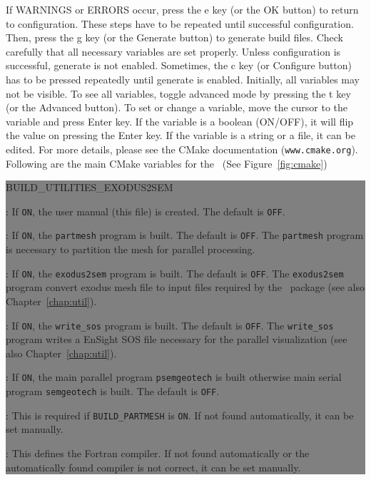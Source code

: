 If WARNINGS or ERRORS occur, press the e key (or the OK button) to return to configuration. These steps have to be repeated until successful configuration. Then, press the g key (or the Generate button) to generate build files. Check carefully that all necessary variables are set properly. Unless configuration is successful, generate is not enabled. Sometimes, the c key (or Configure button) has to be pressed repeatedly until generate is enabled. Initially, all variables may not be visible. To see all variables, toggle advanced mode by pressing the t key (or the Advanced button).
To set or change a variable, move the cursor to the variable and press Enter key. If the variable is a boolean (ON/OFF), it will flip the value on pressing the Enter key. If the variable is a string or a file, it can be edited. For more details, please see the CMake documentation (\texttt{www.cmake.org}).
\\

Following are the main CMake variables for the \pack\ (See Figure~\ref{fig:cmake})

\colorbox{gray}{
\parbox{15.5cm}{
\begin{adescription}{BUILD\_UTILITIES\_EXODUS2SEM}
\item[BUILD\_DOCUMENTATION]           : If \texttt{ON}, the user manual (this file) is created. The default is \texttt{OFF}.
\item[BUILD\_PARTMESH]                : If \texttt{ON}, the \texttt{partmesh} program is built. The default is \texttt{OFF}. The \texttt{partmesh} program is necessary to partition the mesh for parallel processing.
\item[BUILD\_UTILITIES\_EXODUS2SEM]   : If \texttt{ON}, the \texttt{exodus2sem} program is built. The default is \texttt{OFF}. The \texttt{exodus2sem} program convert exodus mesh file to input files required by the \pack\ package (see also Chapter~\ref{chap:util}).
\item[BUILD\_UTILITIES\_WRITE\_SOS]   : If \texttt{ON}, the \texttt{write\_sos} program is built. The default is \texttt{OFF}. The \texttt{write\_sos} program writes a EnSight SOS file necessary for the parallel visualization (see also Chapter~\ref{chap:util}).
\item[ENABLE\_MPI]                    : If \texttt{ON}, the main parallel program \texttt{psemgeotech} is built otherwise main serial program \texttt{semgeotech} is built. The default is \texttt{OFF}.
\item[SCOTCH\_LIBRARY\_PATH]          : This is required if \texttt{BUILD\_PARTMESH} is \texttt{ON}. If not found automatically, it can be set manually.
\item[CMAKE\_Fortran\_COMPILER]       : This defines the Fortran compiler. If not found automatically or the automatically found compiler is not correct, it can be set manually.
\end{adescription}
}}\\

